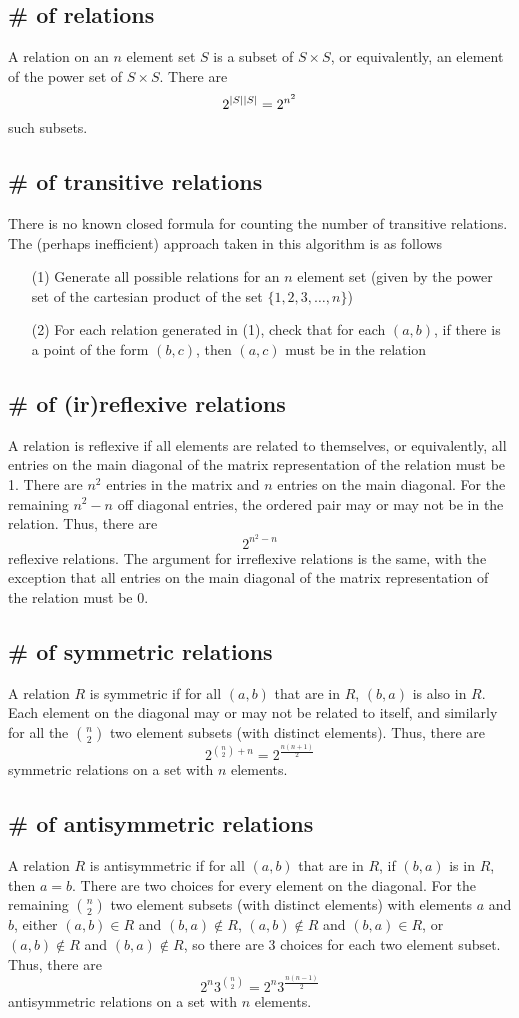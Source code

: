 \documentclass{article}
\begin{document}
\subsection{\# of relations}
A relation on an $n$ element set $S$ is a subset of $S \times S$, or equivalently, an element of the power set of $S \times S$. There are
\[2^{\,\abs{S}\,\abs{S}}=2^{n^2}\]
such subsets.
\subsection{\# of transitive relations}
There is no known closed formula for counting the number of transitive relations. The (perhaps inefficient) approach taken in this algorithm is as follows
\begin{enumerate}
\item[(1)] Generate all possible relations for an $n$ element set (given by the power set of the cartesian product of the set $\{1,2,3,\dots,n\}$)
\item[(2)] For each relation generated in (1), check that for each $(a,b)$, if there is a point of the form $(b,c)$, then $(a,c)$ must be in the relation
\end{enumerate}
\subsection{\# of (ir)reflexive relations}
A relation is reflexive if all elements are related to themselves, or equivalently, all entries on the main diagonal of the matrix representation of the relation must be 1. There are $n^2$ entries in the matrix and $n$ entries on the main diagonal. For the remaining $n^2-n$ off diagonal entries, the ordered pair may or may not be in the relation. Thus, there are
\[2^{n^2-n}\]
reflexive relations. The argument for irreflexive relations is the same, with the exception that all entries on the main diagonal of the matrix representation of the relation must be 0.
\subsection{\# of symmetric relations}
A relation $R$ is symmetric if for all $(a,b)$ that are in $R$, $(b,a)$ is also in $R$. Each element on the diagonal may or may not be related to itself, and similarly for all the ${n \choose 2}$ two element subsets (with distinct elements). Thus, there are
\[2^{{n \choose 2} + n} = 2^{\frac{n(n+1)}{2}}\]
symmetric relations on a set with $n$ elements.
\subsection{\# of antisymmetric relations}
A relation $R$ is antisymmetric if for all $(a,b)$ that are in $R$, if $(b,a)$ is in $R$, then $a=b$. There are two choices for every element on the diagonal. For the remaining ${n \choose 2}$ two element subsets (with distinct elements) with elements $a$ and $b$, either $(a,b) \in R$ and $(b,a) \not \in R$, $(a,b) \not \in R$ and $(b,a) \in R$, or $(a,b) \not \in R$ and $(b,a) \not \in R$, so there are 3 choices for each two element subset. Thus, there are
\[2^n3^{{n \choose 2}} = 2^n3^{\frac{n(n-1)}{2}}\]
antisymmetric relations on a set with $n$ elements.
\end{document}
